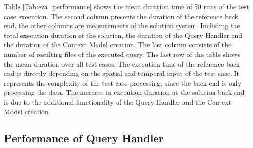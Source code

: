 \documentclass[draft,final]{vutinfth} %
\begin{document}
Table \ref{Tab:eva_performance} shows the mean duration time of 50 runs of the test case execution. The second column presents the duration of the reference back end, the other columns are measurements of the solution system. Including the total execution duration of the solution, the duration of the Query Handler and the duration of the Context Model creation. The last column consists of the number of resulting files of the executed query. The last row of the table shows the mean duration over all test cases.
The execution time of the reference back end is directly depending on the spatial and temporal input of the test case. It represents the complexity of the test case processing, since the back end is only processing the data. The increase in execution duration at the solution back end is due to the additional functionality of the Query Handler and the Context Model creation.  \\

\subsection{Performance of Query Handler}\label{Evaluation:impact_perf_query}
\end{document}
